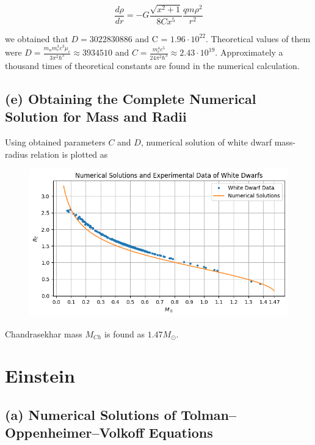 \documentclass[aps,twocolumn,showpacs,preprintnumbers,nofootinbib,prl,superscriptaddress,groupedaddress]{revtex4-2}
\begin{document}
\begin{equation}
	\frac{d\rho}{dr} = -G \frac{\sqrt{x^2+1}}{8Cx^5}\frac{qm\rho^2}{r^2}
\end{equation}

we obtained that $D = 3022830886$ and C = $1.96 \cdot 10^{22}$. Theoretical values of them were $D = \frac{m_{u}m_{e}^{3}c^{3}\mu_{e}}{3\pi^{2}\hbar^{3}} \approx 3934510$ and $C = \frac{m_{e}^{4}c^{5}}{24\pi^{2}\hbar^{3}} \approx 2.43 \cdot 10^{19}$. Approximately a thousand times of theoretical constants are found in the numerical calculation.

\subsection{(e) Obtaining the Complete Numerical Solution for Mass and Radii}

Using obtained parameters $C$ and $D$, numerical solution of white dwarf mass-radius relation is plotted as

\begin{figure}[!htb]
	\centering
	\includegraphics[width=1\linewidth]{Plots/newton-part-e}
	\label{fig:newton-part-e}
\end{figure}
\FloatBarrier

Chandrasekhar mass $M_{Ch}$ is found as $1.47M_\odot$.

\section{Einstein}

\subsection{(a) Numerical Solutions of Tolman–Oppenheimer–Volkoff Equations}
\end{document}
